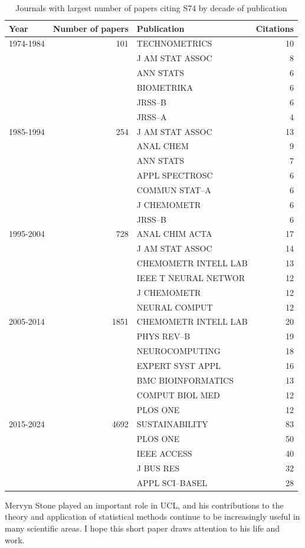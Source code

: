 \documentclass[12pt]{article}  %
\begin{document}
\begin{table}[h]
\begin{center}
\begin{tabular}{|lrlr|}
\hline
Year	 &	Number of papers & Publication &		Citations	\\
\hline
1974-1984	&	101 & TECHNOMETRICS	&	10	\\
	&	& J AM STAT ASSOC	&	8	\\
	&	& ANN 	STATS	&	6	\\
	&	& BIOMETRIKA	&	6	\\
	&	& JRSS--B	&	6	\\
	& & JRSS--A	&	4	\\
1985-1994	&254	& J AM STAT ASSOC	&	13	\\
	&	& ANAL CHEM	&	9	\\
	&	& ANN STATS	&	7	\\
	&	& APPL SPECTROSC	&	6	\\
	&	& COMMUN STAT--A	&	6	\\
	&	& J CHEMOMETR	&	6	\\
	&	& JRSS--B	&	6	\\
1995-2004&728 	&	ANAL CHIM ACTA	&	17	\\
   && 	J AM STAT ASSOC	&	14	\\
 	&	& CHEMOMETR INTELL LAB	&	13	\\
	&	& IEEE  T NEURAL NETWOR	&	12	\\
	&	& J CHEMOMETR	&	12	\\
	&	& NEURAL COMPUT	&	12	\\
2005-2014& 1851	&	CHEMOMETR INTELL LAB	&	20	\\
	&& 	PHYS REV--B	&	19	\\
	&& 	NEUROCOMPUTING	&	18	\\
	&& 	EXPERT SYST APPL	&	16	\\
	&	& BMC BIOINFORMATICS	&	13	\\
	&	& COMPUT BIOL MED	&	12	\\
	&& 	PLOS ONE	&	12	\\
2015-2024	& 4692 & 	SUSTAINABILITY	&	83	\\
&	& PLOS ONE	&	50	\\
	&& 	IEEE ACCESS	&	40	\\
	&	& J BUS RES	&	32	\\
	&& 	APPL SCI--BASEL	&	28\\
\hline
\end{tabular}
\caption{Journals with largest number of papers citing S74 by decade of publication}
\end{center}
\end{table}

Mervyn Stone played an important role in UCL, and his contributions to the theory and application of statistical methods continue to be increasingly useful in many scientific areas.  
I hope this short paper draws attention to his life and work.
\end{document}

